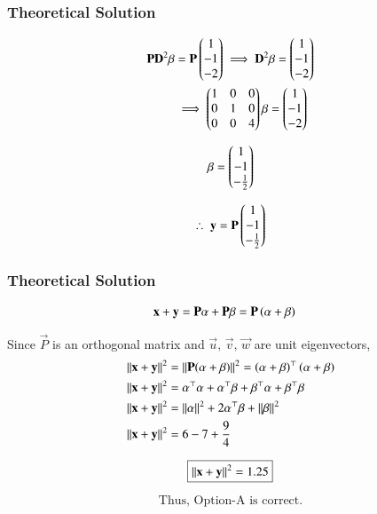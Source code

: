 \documentclass{beamer}
\begin{document}
\begin{frame}[fragile]
    \frametitle{Theoretical Solution}
\begin{align}
\mathbf{P}\mathbf{D}^2\mathbf{\beta} &= \mathbf{P} \begin{pmatrix}1 \\ -1 \\ -2\end{pmatrix} \implies \mathbf{D}^2\mathbf{\beta} = \begin{pmatrix}1 \\ -1 \\ -2\end{pmatrix} \\
&\implies \begin{pmatrix}1 & 0 & 0 \\ 0 & 1 & 0 \\ 0 & 0 & 4\end{pmatrix} \mathbf{\beta} = \begin{pmatrix}1 \\ -1 \\ -2\end{pmatrix}
\end{align}


\begin{equation}
\mathbf{\beta} = \begin{pmatrix}1 \\ -1 \\ -\frac{1}{2}\end{pmatrix}
\end{equation}

\begin{equation}
\therefore \; \mathbf{y} = \mathbf{P} \begin{pmatrix}1 \\ -1 \\ -\frac{1}{2}\end{pmatrix}
\end{equation}

\end{frame}

\begin{frame}[fragile]
    \frametitle{Theoretical Solution}
\begin{align}
\mathbf{x} + \mathbf{y} &= \mathbf{P}\mathbf{\alpha} + \mathbf{P}\mathbf{\beta} = \mathbf{P}\left(\mathbf{\alpha} + \mathbf{\beta}\right)
\end{align}

Since $\vec{P}$ is an orthogonal matrix and $\vec{u}, \, \vec{v}, \, \vec{w}$ are unit eigenvectors,
\begin{align}
\left\lVert\mathbf{x} + \mathbf{y}\right\rVert^2 &= \left\lVert\mathbf{P}(\mathbf{\alpha} + \mathbf{\beta})\right\rVert^2 = \left( \mathbf{\alpha} + \mathbf{\beta}\right)^\top (\mathbf{\alpha} + \mathbf{\beta})\\
\left\lVert\mathbf{x} + \mathbf{y}\right\rVert^2 &=  \mathbf{\alpha}^\top\mathbf{\alpha} + \mathbf{\alpha}^\top\mathbf{\beta} + \mathbf{\beta}^\top\mathbf{\alpha} + \mathbf{\beta}^\top\mathbf{\beta}\\
\left\lVert\mathbf{x} + \mathbf{y}\right\rVert^2 &= \left\lVert\mathbf{\alpha}\right\rVert^2 + 2\mathbf{\alpha}^\top\mathbf{\beta} +
\left\lVert\mathbf{\beta}\right\rVert^2\\
\left\lVert\mathbf{x} + \mathbf{y}\right\rVert^2 &= 6 - 7 + \dfrac{9}{4}
\end{align}

\begin{align*}
    \boxed{\left\lVert\mathbf{x} + \mathbf{y}\right\rVert^2 = 1.25}
\end{align*}

\begin{equation}
\boxed{\text{Thus, Option-A is correct.}}
\end{equation}
\end{frame}
\end{document}

